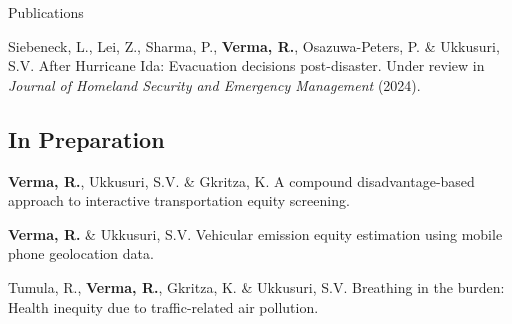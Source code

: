 \documentclass{CV} %
\begin{document}
\begin{rSection}{Publications}
\begin{etaremune}
        \item Siebeneck, L., Lei, Z., Sharma, P., \textbf{Verma, R.}, Osazuwa-Peters, P. \& Ukkusuri, S.V. After Hurricane Ida: Evacuation decisions post-disaster. Under review in \textit{Journal of Homeland Security and Emergency Management} (2024).
    \end{etaremune}
    
    \subsection*{In Preparation}
    \begin{etaremune}
        \item \textbf{Verma, R.}, Ukkusuri, S.V. \& Gkritza, K. A compound disadvantage-based approach to interactive transportation equity screening.
        
        \item \textbf{Verma, R.} \& Ukkusuri, S.V. Vehicular emission equity estimation using mobile phone geolocation data.
        
        \item Tumula, R., \textbf{Verma, R.}, Gkritza, K. \& Ukkusuri, S.V. Breathing in the burden: Health inequity due to traffic-related air pollution.
    \end{etaremune}
\end{rSection}
\end{document}
